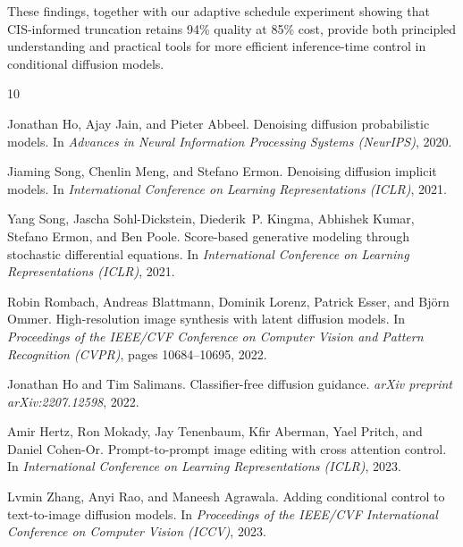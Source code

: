 \documentclass{article}
\begin{document}
These findings, together with our adaptive schedule experiment showing that CIS-informed truncation retains 94\% quality at 85\% cost, provide both principled understanding and practical tools for more efficient inference-time control in conditional diffusion models.


\begin{thebibliography}{10}

Jonathan Ho, Ajay Jain, and Pieter Abbeel.
\newblock Denoising diffusion probabilistic models.
\newblock In \emph{Advances in Neural Information Processing Systems (NeurIPS)}, 2020.

Jiaming Song, Chenlin Meng, and Stefano Ermon.
\newblock Denoising diffusion implicit models.
\newblock In \emph{International Conference on Learning Representations (ICLR)}, 2021.

Yang Song, Jascha Sohl-Dickstein, Diederik~P. Kingma, Abhishek Kumar, Stefano Ermon, and Ben Poole.
\newblock Score-based generative modeling through stochastic differential equations.
\newblock In \emph{International Conference on Learning Representations (ICLR)}, 2021.

Robin Rombach, Andreas Blattmann, Dominik Lorenz, Patrick Esser, and Bj\"{o}rn Ommer.
\newblock High-resolution image synthesis with latent diffusion models.
\newblock In \emph{Proceedings of the IEEE/CVF Conference on Computer Vision and Pattern Recognition (CVPR)}, pages 10684--10695, 2022.

Jonathan Ho and Tim Salimans.
\newblock Classifier-free diffusion guidance.
\newblock \emph{arXiv preprint arXiv:2207.12598}, 2022.

Amir Hertz, Ron Mokady, Jay Tenenbaum, Kfir Aberman, Yael Pritch, and Daniel Cohen-Or.
\newblock Prompt-to-prompt image editing with cross attention control.
\newblock In \emph{International Conference on Learning Representations (ICLR)}, 2023.

Lvmin Zhang, Anyi Rao, and Maneesh Agrawala.
\newblock Adding conditional control to text-to-image diffusion models.
\newblock In \emph{Proceedings of the IEEE/CVF International Conference on Computer Vision (ICCV)}, 2023.


\end{thebibliography}
\end{document}
